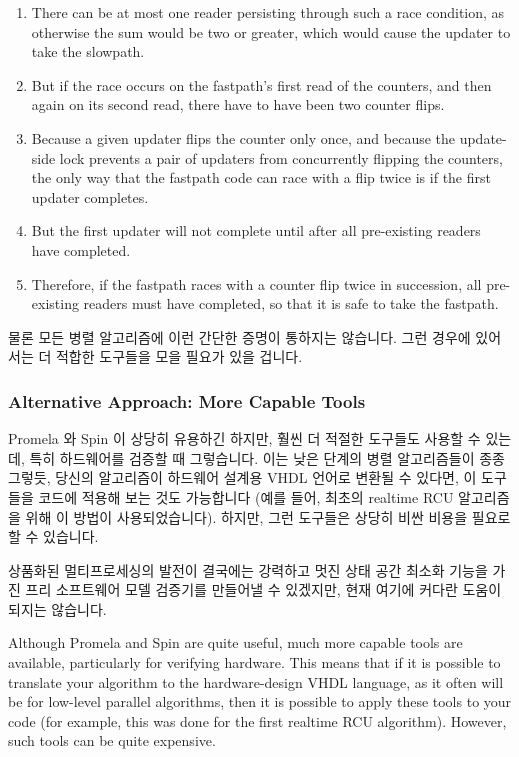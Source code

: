 \begin{enumerate}
\item	There can be at most one reader persisting through such
	a race condition, as otherwise the sum would be two or
	greater, which would cause the updater to take the slowpath.
\item	But if the race occurs on the fastpath's first read of the
	counters, and then again on its second read, there have
	to have been two counter flips.
\item	Because a given updater flips the counter only once, and
	because the update-side lock prevents a pair of updaters
	from concurrently flipping the counters, the only way that
	the fastpath code can race with a flip twice is if the
	first updater completes.
\item	But the first updater will not complete until after all
	pre-existing readers have completed.
\item	Therefore, if the fastpath races with a counter flip
	twice in succession, all pre-existing readers must have
	completed, so that it is safe to take the fastpath.
\fi
\end{enumerate}

물론 모든 병렬 알고리즘에 이런 간단한 증명이 통하지는 않습니다.
그런 경우에 있어서는 더 적합한 도구들을 모을 필요가 있을 겁니다.
\iffalse

Of course, not all parallel algorithms have such simple proofs.
In such cases, it may be necessary to enlist more capable tools.
\fi

\subsubsection{Alternative Approach: More Capable Tools}
\label{sec:formal:Alternative Approach: More Capable Tools}

Promela 와 Spin 이 상당히 유용하긴 하지만, 훨씬 더 적절한 도구들도 사용할 수
있는데, 특히 하드웨어를 검증할 때 그렇습니다.
이는 낮은 단계의 병렬 알고리즘들이 종종 그렇듯, 당신의 알고리즘이 하드웨어
설계용 VHDL 언어로 변환될 수 있다면, 이 도구들을 코드에 적용해 보는 것도
가능합니다 (예를 들어, 최초의 realtime RCU 알고리즘을 위해 이 방법이
사용되었습니다).
하지만, 그런 도구들은 상당히 비싼 비용을 필요로 할 수 있습니다.

상품화된 멀티프로세싱의 발전이 결국에는 강력하고 멋진 상태 공간 최소화 기능을
가진 프리 소프트웨어 모델 검증기를 만들어낼 수 있겠지만, 현재 여기에 커다란
도움이 되지는 않습니다.
\iffalse

Although Promela and Spin are quite useful,
much more capable tools are available, particularly for verifying
hardware.
This means that if it is possible to translate your algorithm
to the hardware-design VHDL language, as it often will be for
low-level parallel algorithms, then it is possible to apply these
tools to your code (for example, this was done for the first
realtime RCU algorithm).
However, such tools can be quite expensive.


